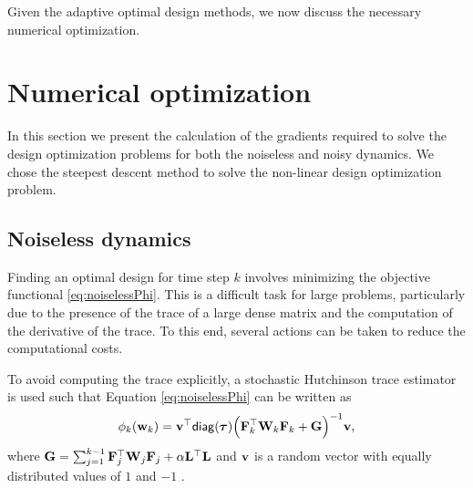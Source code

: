\documentclass[11pt]{article}
\newcommand{\bfF}	{{\bf{F}}}
\newcommand{\bfG}	{{\bf{G}}}
\newcommand{\bfL}	{{\bf{L}}}
\newcommand{\bfW}	{{\bf{W}}}
\newcommand{\bfv}	{{\bf{v}}}
\newcommand{\bfw}	{{\bf{w}}}
\newcommand{\bftau}      {{\boldsymbol \tau}}
\newcommand{\LtL}       { \bfL^{\top}\bfL}
\begin{document}
Given the adaptive optimal design  methods, we now discuss the necessary  numerical optimization.




\section{Numerical optimization}
\label{sec:Opt}
In this section we present the calculation of the gradients required to solve the design optimization problems for both the noiseless and noisy dynamics. We chose the steepest descent method to solve the non-linear design optimization problem.
\subsection{Noiseless dynamics}
Finding an optimal design for  time step $k$ involves minimizing the objective functional \eqref{eq:noiselessPhi}. 
This is a difficult task for large problems, particularly due to the presence of the trace of a large dense matrix and the computation of the derivative of the trace. To this end, several actions can be taken to reduce the computational costs.

To avoid computing the trace explicitly, a stochastic Hutchinson trace estimator  is used  such that Equation \eqref{eq:noiselessPhi} can be written as
\begin{equation*}
\phi_k(\bfw_k) = \bfv^{\top}{\sf diag}(\bftau) \Big(\bfF_k^{\top}\bfW_k\bfF_k   + \bfG \Big)^{-1}\bfv,
\end{equation*}
where $\bfG = \sum_{j=1}^{k-1}\bfF_{j}^{\top}\bfW_{j}\bfF_{j}+ \alpha\LtL$ and $\bfv$ is a random vector with equally distributed values of $1$ and $-1$ \cite{Hutchinson1990}. 
\end{document}
